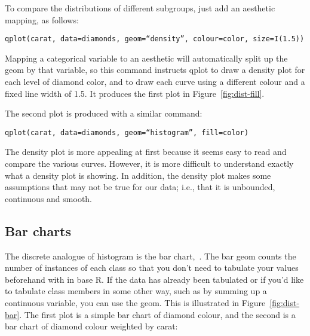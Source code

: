 To compare the distributions of different subgroups, just add an aesthetic mapping, as follows:

{\tt qplot(carat, data=diamonds, geom=``density'', colour=color, size=I(1.5))}

Mapping a categorical variable to an aesthetic will automatically split up the geom by that variable, so this command instructs qplot to draw a density plot for each level of diamond color, and to draw each curve using a different colour and a fixed line width of 1.5. It produces the first plot in Figure~\ref{fig:dist-fill}.

The second plot is produced with a similar command:

{\tt qplot(carat, data=diamonds, geom=``histogram'', fill=color)}

The density plot is more appealing at first because it seems easy to read and compare the various curves. However, it is more difficult to understand exactly what a density plot is showing.  In addition, the density plot makes some assumptions that may not be true for our data; i.e., that it is unbounded, continuous and smooth.

% 


\subsection{Bar charts}
\label{sub:bar}

The discrete analogue of histogram is the bar chart,~.  The bar geom counts the number of instances of each class so that you don't need to tabulate your values beforehand with  in base R.  If the data has already been tabulated or if you'd like to tabulate class members in some other way, such as by summing up a continuous variable, you can use the  geom. This is illustrated in Figure~\ref{fig:dist-bar}.  The first plot is a simple bar chart of diamond colour, and the second is a bar chart of diamond colour weighted by carat:


